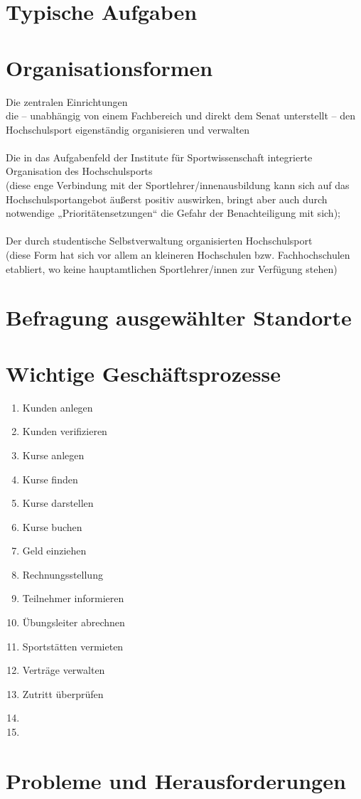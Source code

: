 \section{Typische Aufgaben}
\section{Organisationsformen}
Die zentralen Einrichtungen\\
die – unabhängig von einem Fachbereich und direkt dem Senat unterstellt – den Hochschulsport eigenständig organisieren und verwalten
\\ \\
Die in das Aufgabenfeld der Institute für Sportwissenschaft integrierte Organisation des Hochschulsports \\
(diese enge Verbindung mit der Sportlehrer/innenausbildung kann sich auf das Hochschulsportangebot äußerst positiv auswirken, bringt aber auch durch notwendige „Prioritätensetzungen“ die Gefahr der Benachteiligung mit sich);
\\ \\
Der durch studentische Selbstverwaltung organisierten Hochschulsport \\
(diese Form hat sich vor allem an kleineren Hochschulen bzw. Fachhochschulen etabliert, wo keine hauptamtlichen Sportlehrer/innen zur Verfügung stehen)
\cite[vgl.][]{Radde.1996}


\section{Befragung ausgewählter Standorte}
\section{Wichtige Geschäftsprozesse}
\begin{enumerate}
\item Kunden anlegen
\item Kunden verifizieren
\item Kurse anlegen
\item Kurse finden
\item Kurse darstellen
\item Kurse buchen
\item Geld einziehen
\item Rechnungsstellung
\item Teilnehmer informieren
\item Übungsleiter abrechnen
\item Sportstätten vermieten
\item Verträge verwalten
\item Zutritt überprüfen
\item 
\item 
\end{enumerate}
\section{Probleme und Herausforderungen}